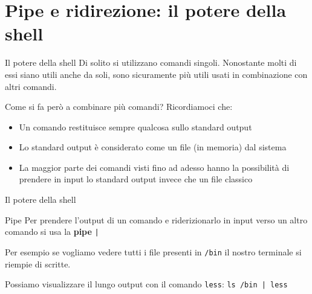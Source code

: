 \documentclass{beamer}
\begin{document}
\section{Pipe e ridirezione: il potere della shell}
\begin{frame}{Il potere della shell}
  Di solito si utilizzano comandi singoli. Nonostante molti di essi siano utili 
  anche da soli, sono sicuramente più utili usati in combinazione con altri 
  comandi.\bigskip

  Come si fa però a combinare più comandi? \pause
  Ricordiamoci che:
  \begin{itemize}
    \item <2-> Un comando restituisce sempre qualcosa sullo standard output
    \item <3-> Lo standard output è considerato come un file (in memoria) dal 
      sistema 
    \item <4-> La maggior parte dei comandi visti fino ad adesso hanno la 
      possibilità di prendere in input lo standard output invece che un file 
      classico
  \end{itemize}
\end{frame}

\begin{frame}{Il potere della shell}
  \begin{figure}
  \end{figure}
\end{frame}

\begin{frame}{Pipe}
  Per prendere l'output di un comando e riderizionarlo in input verso un altro
  comando si usa la \textbf{pipe} \texttt{|}\bigskip

  Per esempio se vogliamo vedere tutti i file presenti in \texttt{/bin} il 
  nostro terminale si riempie di scritte.\bigskip

  Possiamo visualizzare il lungo output con il comando \texttt{less}: 
  \texttt{ls /bin | less}
\end{frame}
\end{document}
